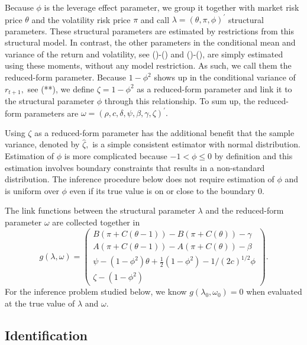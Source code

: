 \documentclass[11pt]{article}
\begin{document}
Because $\phi $ is the leverage effect parameter, we group it together with
market risk price $\theta $ and the volatility risk price $\pi $ and call $%
\lambda =(\theta ,\pi ,\phi )^{\prime }$ structural parameters. These
structural parameters are estimated by restrictions from this structural
model. In contrast, the other parameters in the conditional mean and
variance of the return and volatility, see ()-() and ()-(), are simply
estimated using these moments, without any model restriction. As such, we
call them the reduced-form parameter. Because $1-\phi ^{2}$ shows up in the
conditional variance of $r_{t+1},$ see (**), we define $\zeta =1-\phi ^{2}$
as a reduced-form parameter and link it to the structural parameter $\phi $
through this relationship. To sum up, the reduced-form parameters are $%
\omega =(\rho ,c,\delta ,\psi ,\beta ,\gamma ,\zeta )^{\prime }.$

Using $\zeta $ as a reduced-form parameter has the additional benefit that
the sample variance, denoted by $\widehat{\zeta },$ is a simple consistent
estimator with normal distribution. Estimation of $\phi $ is more
complicated because $-1<\phi \leq 0$ by definition and this estimation
involves boundary constraints that results in a non-standard distribution.
The inference procedure below does not require estimation of $\phi $ and is
uniform over $\phi $ even if its true value is on or close to the boundary $%
0.$

The link functions between the structural parameter $\lambda $ and the
reduced-form parameter $\omega $ are collected together in%
\begin{equation}
g(\lambda ,\omega )=\left( 
\begin{array}{c}
B\left( \pi +C\left( \theta -1\right) \right) -B\left( \pi +C\left( \theta
\right) \right) -\gamma  \\ 
A\left( \pi +C\left( \theta -1\right) \right) -A\left( \pi +C\left( \theta
\right) \right) -\beta  \\ 
\psi -(1-\phi ^{2})\theta +\frac{1}{2}(1-\phi ^{2})-1/(2c)^{1/2}\phi  \\ 
\zeta -\left( 1-\phi ^{2}\right) 
\end{array}%
\right) .
\end{equation}%
For the inference problem studied below, we know $g(\lambda _{0},\omega
_{0})=0$ when evaluated at the true value of $\lambda $ and $\omega .$

\subsection{Identification}
\end{document}
